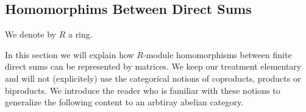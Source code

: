 \subsection{Homomorphims Between Direct Sums}


\begin{conventions}
  We denote by $R$ a ring.
\end{conventions}


\begin{fluff}
  In this section we will explain how $R$-module homomorphisms between finite direct sums can be represented  by matrices.
  We keep our treatment elementary and will not (explicitely) use the categorical notions of coproducts, products or biproducts.
  We introduce the reader who is familiar with these notions to generalize the following content to an arbtiray abelian category.
\end{fluff}
